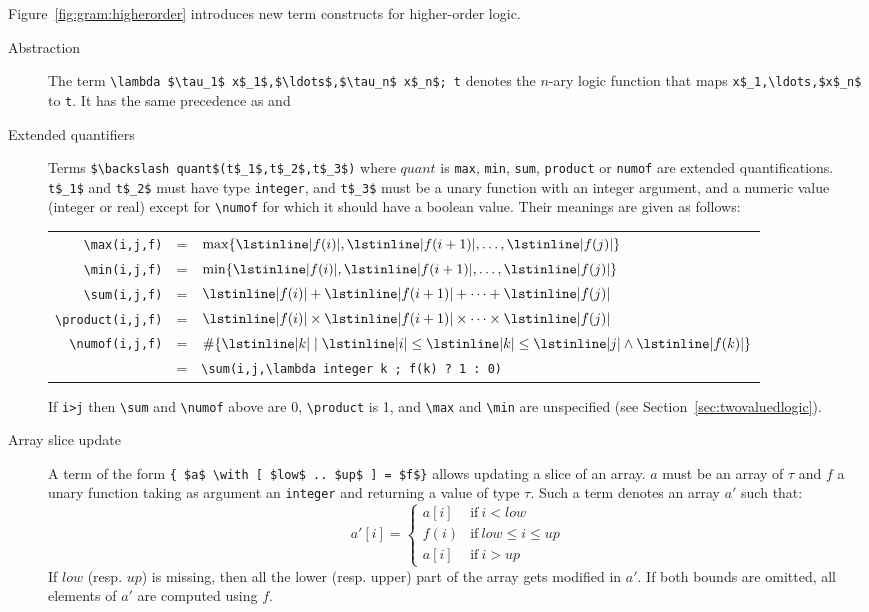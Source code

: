 Figure~\ref{fig:gram:higherorder} introduces new term constructs for
higher-order logic.
\begin{description}
\item[Abstraction]
  The term \lstinline|\lambda $\tau_1$ x$_1$,$\ldots$,$\tau_n$ x$_n$; t|
  denotes the $n$-ary logic function that maps \lstinline|x$_1,\ldots,$x$_n$| to
  \lstinline|t|. It has the same precedence as \Forall and \Exists
\item[Extended quantifiers]
  Terms
 \lstinline|$\backslash quant$(t$_1$,t$_2$,t$_3$)|
  where $quant$ is \lstinline|max|,
  \lstinline|min|,
  \lstinline|sum|,
  \lstinline|product|
  or \lstinline|numof|
  are extended quantifications. \lstinline|t$_1$| and \lstinline|t$_2$| must have type
  \lstinline|integer|, and \lstinline|t$_3$| must be a unary function with an integer
  argument, and a numeric value (integer or real) except for
  \lstinline|\numof| for which it should have a boolean value. Their
  meanings are given as follows:
  \begin{tabular}{rcl}
    \lstinline|\max(i,j,f)| &=&
    $\max \{ \lstinline|f(i)|,\lstinline|f(i+1)|, \ldots, \lstinline|f(j)| \}$\\
    \lstinline|\min(i,j,f)| &=&
    $\min \{ \lstinline|f(i)|,\lstinline|f(i+1)|, \ldots, \lstinline|f(j)| \}$\\
    \lstinline|\sum(i,j,f)| &=&
    $\lstinline|f(i)|+\lstinline|f(i+1)|+\cdots+\lstinline|f(j)|$ \\
    \lstinline|\product(i,j,f)| &=&
    $\lstinline|f(i)|\times\lstinline|f(i+1)|\times\cdots\times\lstinline|f(j)|$
    \\
    \lstinline|\numof(i,j,f)| &=&
    $\#\{ \lstinline|k| \mid \lstinline|i| \leq \lstinline|k| \leq
          \lstinline|j| \land \lstinline|f(k)| \}$ \\
&=& \lstinline|\sum(i,j,\lambda integer k ; f(k) ? 1 : 0)|
  \end{tabular}

  If \lstinline|i>j| then \lstinline|\sum| and \lstinline|\numof| above are 0,
  \lstinline|\product| is 1, and \lstinline|\max| and \lstinline|\min| are
  unspecified (see Section~\ref{sec:twovaluedlogic}).
\item[Array slice update]
  A term of the form
  \lstinline|{ $a$ \with [ $low$ .. $up$ ] = $f$}| allows updating a slice of
  an array. $a$ must be an array of $\tau$ and $f$
  a unary function taking as argument
  an \lstinline|integer| and returning a value of type $\tau$. Such a term
  denotes an array $a'$ such that:
  \[
    a'[i] = \left\{\begin{array}{lr}
                    a[i] & \mathrm{if~} i < low \\
                    f(i) & \mathrm{if~} low \leq i \leq up \\
                    a[i] & \mathrm{if~} i > up
                    \end{array}\right.
  \]
If $low$ (resp. $up$) is missing, then all the lower (resp. upper) part of
the array gets modified in $a'$. If both bounds are omitted, all elements of
$a'$ are computed using $f$.


\end{description}
